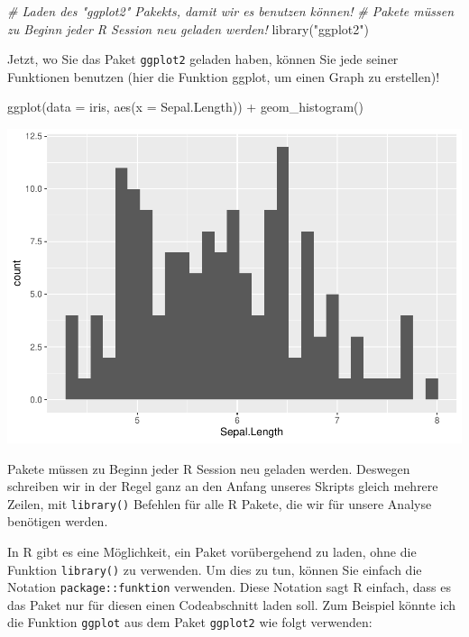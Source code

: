 \documentclass[
]{book}
\newenvironment{Shaded}{\begin{snugshade}}{\end{snugshade}}
\newcommand{\AttributeTok}[1]{\textcolor[rgb]{0.77,0.63,0.00}{#1}}
\newcommand{\CommentTok}[1]{\textcolor[rgb]{0.56,0.35,0.01}{\textit{#1}}}
\newcommand{\FunctionTok}[1]{\textcolor[rgb]{0.00,0.00,0.00}{#1}}
\newcommand{\NormalTok}[1]{#1}
\newcommand{\SpecialCharTok}[1]{\textcolor[rgb]{0.00,0.00,0.00}{#1}}
\newcommand{\StringTok}[1]{\textcolor[rgb]{0.31,0.60,0.02}{#1}}
\begin{document}
\begin{Shaded}
\begin{Highlighting}[]
\CommentTok{\#   Laden des "ggplot2" Pakekts, damit wir es benutzen können!}
\CommentTok{\#   Pakete müssen zu Beginn jeder R Session neu geladen werden!}
\FunctionTok{library}\NormalTok{(}\StringTok{"ggplot2"}\NormalTok{)}
\end{Highlighting}
\end{Shaded}

Jetzt, wo Sie das Paket \texttt{ggplot2} geladen haben, können Sie jede seiner Funktionen benutzen (hier die Funktion ggplot, um einen Graph zu erstellen)!

\begin{Shaded}
\begin{Highlighting}[]
\FunctionTok{ggplot}\NormalTok{(}\AttributeTok{data =}\NormalTok{ iris, }\FunctionTok{aes}\NormalTok{(}\AttributeTok{x =}\NormalTok{ Sepal.Length)) }\SpecialCharTok{+} 
  \FunctionTok{geom\_histogram}\NormalTok{()}
\end{Highlighting}
\end{Shaded}

\includegraphics{CFH_R_bookdown_files/figure-latex/unnamed-chunk-6-1.pdf}

Pakete müssen zu Beginn jeder R Session neu geladen werden. Deswegen schreiben wir in der Regel ganz an den Anfang unseres Skripts gleich mehrere Zeilen, mit \texttt{library()} Befehlen für alle R Pakete, die wir für unsere Analyse benötigen werden.

In R gibt es eine Möglichkeit, ein Paket vorübergehend zu laden, ohne die Funktion \texttt{library()} zu verwenden. Um dies zu tun, können Sie einfach die Notation \texttt{package::funktion} verwenden. Diese Notation sagt R einfach, dass es das Paket nur für diesen einen Codeabschnitt laden soll. Zum Beispiel könnte ich die Funktion \texttt{ggplot} aus dem Paket \texttt{ggplot2} wie folgt verwenden:
\end{document}
